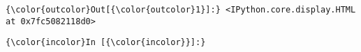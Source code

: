 \documentclass{article}
\begin{document}
            \begin{Verbatim}[commandchars=\\\{\}]
{\color{outcolor}Out[{\color{outcolor}1}]:} <IPython.core.display.HTML at 0x7fc5082118d0>
\end{Verbatim}
        
    \begin{Verbatim}[commandchars=\\\{\}]
{\color{incolor}In [{\color{incolor}}]:} 
\end{Verbatim}


    
    
    
    
\end{document}
